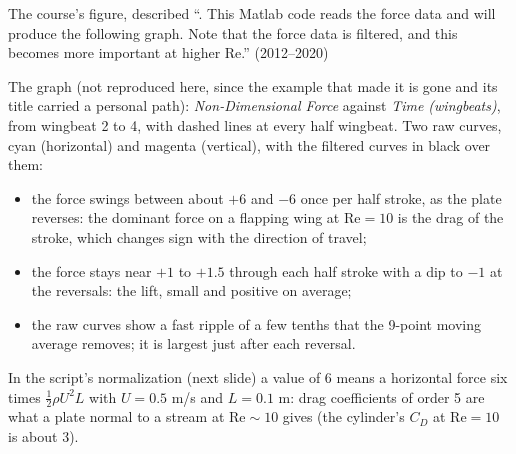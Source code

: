 \documentclass[aspectratio=169,11pt]{beamer}
\begin{document}
\begin{frame}{The course's figure, described}
\label{fr:fruitflyfig}
\small ``. This Matlab code reads the force data and will produce the following graph. Note that the force data is filtered, and this becomes more important at higher $\mathrm{Re}$.'' (2012--2020)
\vspace{1mm}

\footnotesize The graph (not reproduced here, since the example that made it is gone and its title carried a personal path): \emph{Non-Dimensional Force} against \emph{Time (wingbeats)}, from wingbeat 2 to 4, with dashed lines at every half wingbeat. Two raw curves, cyan (horizontal) and magenta (vertical), with the filtered curves in black over them:
\begin{itemize}
  \item the  force swings between about $+6$ and $-6$ once per half stroke, as the plate reverses: the dominant force on a flapping wing at $\mathrm{Re} = 10$ is the drag of the stroke, which changes sign with the direction of travel;
  \item the  force stays near $+1$ to $+1.5$ through each half stroke with a dip to $-1$ at the reversals: the lift, small and positive on average;
  \item the raw curves show a fast ripple of a few tenths that the 9-point moving average removes; it is largest just after each reversal.
\end{itemize}
\vspace{1mm}
\footnotesize In the script's normalization (next slide) a value of 6 means a horizontal force six times $\frac12\rho U^2 L$ with $U = 0.5$ m/s and $L = 0.1$ m: drag coefficients of order 5 are what a plate normal to a stream at $\mathrm{Re} \sim 10$ gives (the cylinder's $C_D$ at $\mathrm{Re} = 10$ is about 3).
\end{frame}
\end{document}
